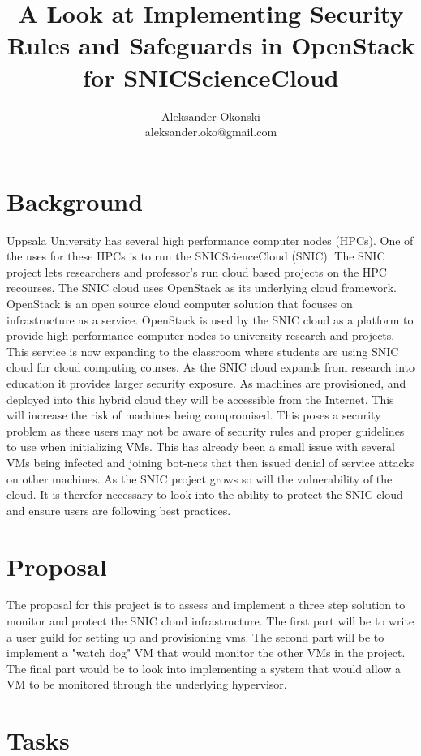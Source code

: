 \documentclass[12pt]{article}
\title{A Look at Implementing Security Rules and Safeguards in OpenStack for SNICScienceCloud}
\author{Aleksander Okonski \\ aleksander.oko@gmail.com}
\date{}
\begin{document}
\maketitle

\section{Background}
Uppsala University has several high performance computer nodes (HPCs). One of the uses for these HPCs is to run the SNICScienceCloud (SNIC). The SNIC project lets researchers and professor's run cloud based projects on the HPC recourses. The SNIC cloud uses OpenStack as its underlying cloud framework. OpenStack is an open source cloud computer solution that focuses on infrastructure as a service. OpenStack is used by the SNIC cloud as a platform to provide high performance computer nodes to university research and projects. This service is now expanding to the classroom where students are using SNIC cloud for cloud computing courses. As the SNIC cloud expands from research into education it provides larger security exposure. As machines are provisioned, and deployed into this hybrid cloud they will be accessible from the Internet. This will increase the risk of machines being compromised. This poses a security problem as these users may not be aware of security rules and proper guidelines to use when initializing VMs. This has already been a small issue with several VMs being infected and joining bot-nets that then issued denial of service attacks on other machines. As the SNIC project grows so will the vulnerability of the cloud. It is therefor necessary to look into the ability to protect the SNIC cloud and ensure users are following best practices.

\section{Proposal}
The proposal for this project is to assess and implement a three step solution to monitor and protect the SNIC cloud infrastructure. The first part will be to write a user guild for setting up and provisioning vms. The second part will be to implement a "watch dog" VM that would monitor the other VMs in the project. The final part would be to look into implementing a system that would allow a VM to be monitored through the underlying hypervisor.

\section{Tasks}
\end{document}
